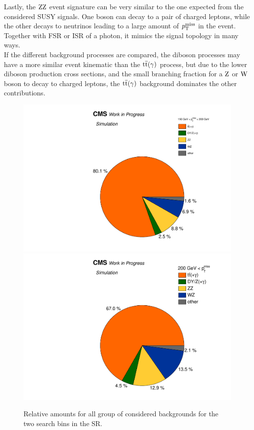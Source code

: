 Lastly, the $\mathrm{Z}\mathrm{Z}$ event signature can be very similar to the one expected from the considered SUSY signals. One boson can decay to a pair of charged leptons, while the other decays to neutrinos leading to a large amount of $p_{\mathrm{T}}^\text{miss}$ in the event. Together with FSR or ISR of a photon, it mimics the signal topology in many ways.\\
If the different background processes are compared, the diboson processes may have a more similar event kinematic than the ${\mathrm{t}\overline{\mathrm{t}}}(\gamma)$ process, but due to the lower diboson production cross sections, and the small branching fraction for a $\mathrm{Z}$ or $\mathrm{W}$ boson to decay to charged leptons, the ${\mathrm{t}\overline{\mathrm{t}}}(\gamma)$ background dominates the other contributions.\\
\begin{figure}[tbp]
 \centering
 \includegraphics[width=\pairwidth]{figures/figures/pie1}
 \includegraphics[width=\pairwidth]{figures/figures/pie2}
 \caption{Relative amounts for all group of considered backgrounds for the two search bins in the SR.}
 \label{fig:PieCharts}
\end{figure}
